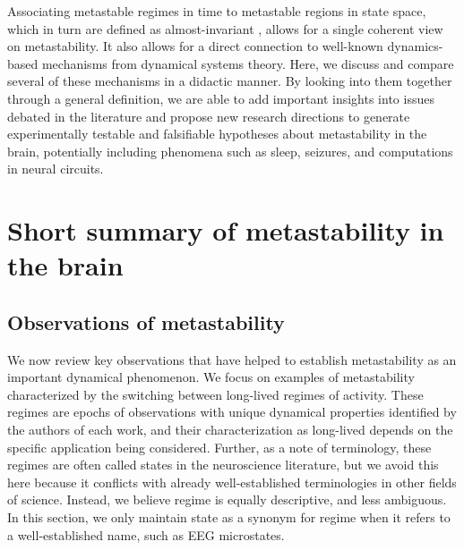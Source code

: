 Associating metastable regimes in time to metastable regions in state space, which in turn are defined as almost-invariant \cite{froyland2005statistically, dellnitz2003congestion}, allows for a single coherent view on metastability. It also allows for a direct connection to well-known dynamics-based mechanisms from dynamical systems theory. Here, we discuss and compare several of these mechanisms in a didactic manner. By looking into them together through a general definition, we are able to add important insights into issues debated in the literature and propose new research directions to generate experimentally testable and falsifiable hypotheses about metastability in the brain, potentially including phenomena such as sleep, seizures, and computations in neural circuits.



\section{Short summary of metastability in the brain}
\subsection{Observations of metastability} \label{sec:observations}
We now review key observations that have helped to establish metastability as an important dynamical phenomenon. We focus on examples of metastability characterized by the switching between long-lived regimes of activity. These regimes are epochs of observations with unique dynamical properties identified by the authors of each work, and their characterization as long-lived depends on the specific application being considered. 
Further, as a note of terminology, these regimes are often called states in the neuroscience literature, but we avoid this here because it conflicts with already well-established terminologies in other fields of science. Instead, we believe regime is equally descriptive, and less ambiguous. In this section, we only maintain state as a synonym for regime when it refers to a well-established name, such as EEG microstates. 

